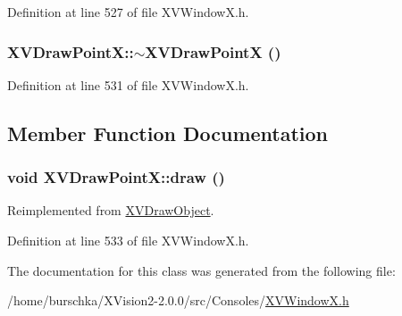 Definition at line 527 of file XVWindow\-X.h.\label{XVDrawPointX_a1}
\hypertarget{class_XVDrawPointX_a1}{
\subsubsection[~XVDrawPointX]{\setlength{\rightskip}{0pt plus 5cm}XVDraw\-Point\-X::$\sim$XVDraw\-Point\-X ()}}




Definition at line 531 of file XVWindow\-X.h.

\subsection{Member Function Documentation}
\label{XVDrawPointX_a2}
\hypertarget{class_XVDrawPointX_a2}{
\subsubsection[draw]{\setlength{\rightskip}{0pt plus 5cm}void XVDraw\-Point\-X::draw ()}}




Reimplemented from \hyperlink{class_XVDrawObject}{XVDraw\-Object}.

Definition at line 533 of file XVWindow\-X.h.

The documentation for this class was generated from the following file:\begin{CompactItemize}
\item 
/home/burschka/XVision2-2.0.0/src/Consoles/\hyperlink{XVWindowX.h-source}{XVWindow\-X.h}\end{CompactItemize}
